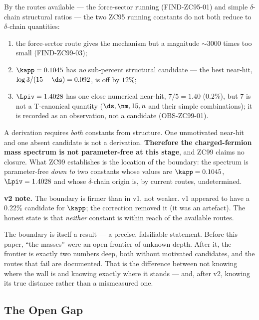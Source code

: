 \documentclass[12pt, a4paper]{article}
\begin{document}
\begin{formalbox}[title={THM-ZC99-01: The Boundary of the Mass Derivation
  (v2: sharpened)}]
By the routes available --- the force-sector running (FIND-ZC95-01) and simple
$\delta$-chain structural ratios --- the two ZC95 running constants do not both
reduce to $\delta$-chain quantities:
\begin{enumerate}[leftmargin=1.8em, noitemsep]
  \item the force-sector route gives the mechanism but a magnitude $\sim3000$
    times too small (FIND-ZC99-03);
  \item $\kapp=0.1045$ has \emph{no} sub-percent structural candidate --- the
    best near-hit, $\log 3/(15-\ds)=0.092$, is off by $12\%$;
  \item $\Lpiv=1.4028$ has one close numerical near-hit, $7/5=1.40$ ($0.2\%$),
    but $7$ is not a T-canonical quantity ($\ds,\nm,15,n$ and their simple
    combinations); it is recorded as an observation, not a candidate
    (OBS-ZC99-01).
\end{enumerate}
A derivation requires \emph{both} constants from structure. One unmotivated
near-hit and one absent candidate is not a derivation. \textbf{Therefore the
charged-fermion mass spectrum is not parameter-free at this stage}, and ZC99
claims no closure. What ZC99 establishes is the location of the boundary: the
spectrum is parameter-free \emph{down to} two constants whose values are
$\kapp=0.1045$, $\Lpiv=1.4028$ and whose $\delta$-chain origin is, by current
routes, undetermined.

\textbf{v2 note.} The boundary is firmer than in v1, not weaker. v1 appeared to
have a $0.22\%$ candidate for $\kapp$; the correction removed it (it was an
artefact). The honest state is that \emph{neither} constant is within reach of
the available routes.
\end{formalbox}

The boundary is itself a result --- a precise, falsifiable statement. Before
this paper, ``the masses'' were an open frontier of unknown depth. After it, the
frontier is exactly two numbers deep, both without motivated candidates, and the
routes that fail are documented. That is the difference between not knowing where
the wall is and knowing exactly where it stands --- and, after v2, knowing its
true distance rather than a mismeasured one.

\subsection{The Open Gap}
\label{sec:gap-zc99}
\end{document}
